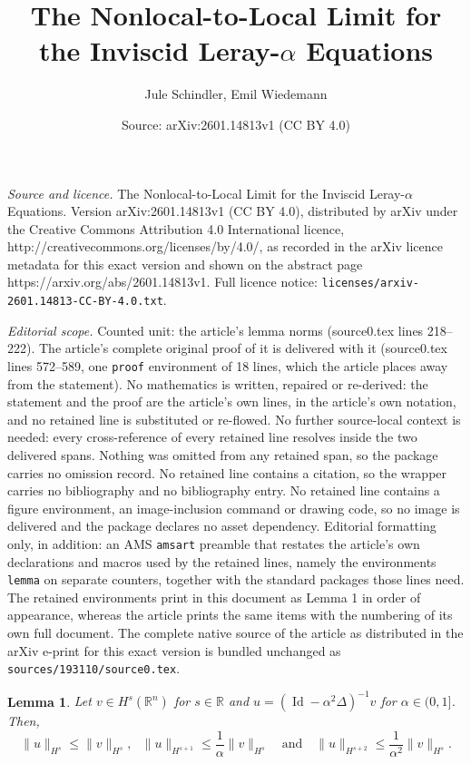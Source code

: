 \documentclass[10pt,a4paper]{amsart}
\title{The Nonlocal-to-Local Limit for the Inviscid Leray-$\alpha$ Equations}
\author{Jule Schindler, Emil Wiedemann}
\date{Source: arXiv:2601.14813v1 (CC BY 4.0)}
\newtheorem{lemma}{Lemma}
\begin{document}
\maketitle

\noindent\emph{Source and licence.} The Nonlocal-to-Local Limit for the Inviscid Leray-$\alpha$ Equations. Version arXiv:2601.14813v1 (CC BY 4.0), distributed by arXiv under the Creative Commons Attribution 4.0 International licence, http://creativecommons.org/licenses/by/4.0/, as recorded in the arXiv licence metadata for this exact version and shown on the abstract page https://arxiv.org/abs/2601.14813v1. Full licence notice: \texttt{licenses/arxiv-2601.14813-CC-BY-4.0.txt}.\par\smallskip

\noindent\textit{Editorial scope.} Counted unit: the article's lemma norms (source0.tex lines 218--222). The article's complete original proof of it is delivered with it (source0.tex lines 572--589, one \texttt{proof} environment of 18 lines, which the article places away from the statement). No mathematics is written, repaired or re-derived: the statement and the proof are the article's own lines, in the article's own notation, and no retained line is substituted or re-flowed.  No further source-local context is needed: every cross-reference of every retained line resolves inside the two delivered spans.  Nothing was omitted from any retained span, so the package carries no omission record.  No retained line contains a citation, so the wrapper carries no bibliography and no bibliography entry.  No retained line contains a figure environment, an image-inclusion command or drawing code, so no image is delivered and the package declares no asset dependency.  Editorial formatting only, in addition: an AMS \texttt{amsart} preamble that restates the article's own declarations and macros used by the retained lines, namely the environments \texttt{lemma} on separate counters, together with the standard packages those lines need.  The retained environments print in this document as Lemma 1 in order of appearance, whereas the article prints the same items with the numbering of its own full document.  The complete native source of the article as distributed in the arXiv e-print for this exact version is bundled unchanged as \texttt{sources/193110/source0.tex}.
 \begin{lemma}
 \label{lemma: relation norms}
Let $v\in H^s(\mathbb{R}^n)$ for $s\in \mathbb{R}$ and $u=(\operatorname{Id}-\alpha^2\Delta)^{-1}v$ for $\alpha\in(0,1]$. Then,
$$ \|u\|_{H^s} \leq \|v\|_{H^s}, \ \ \ \|u\|_{H^{s+1}} \leq \frac{1}{\alpha} \|v\|_{H^s} \ \ \ \text{ and } \ \ \ \|u\|_{H^{s+2}} \leq \frac{1}{\alpha^2} \|v\|_{H^s}.$$
\end{lemma}
\end{document}
